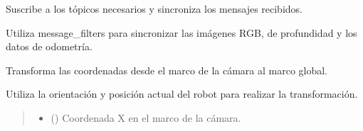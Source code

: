 \documentclass[a4paper,10pt,spanish]{sphinxmanual}
\begin{document}
\begin{fulllineitems}
\begin{fulllineitems}
\begin{quote}
\begin{description}
\end{description}\end{quote}

\end{fulllineitems}


\begin{fulllineitems}
\label{\detokenize{squad_object_detection_action:squad_object_detection_action.TurtleBotObjectDetectionAction.subscribe_to_topics}}
\pysigstartsignatures
{}
\pysigstopsignatures
\sphinxAtStartPar
Suscribe a los tópicos necesarios y sincroniza los mensajes recibidos.

\sphinxAtStartPar
Utiliza message\_filters para sincronizar las imágenes RGB, de profundidad y los datos de odometría.

\end{fulllineitems}


\begin{fulllineitems}
\label{\detokenize{squad_object_detection_action:squad_object_detection_action.TurtleBotObjectDetectionAction.transform_camera_to_global}}
\pysigstartsignatures
{}
\pysigstopsignatures
\sphinxAtStartPar
Transforma las coordenadas desde el marco de la cámara al marco global.

\sphinxAtStartPar
Utiliza la orientación y posición actual del robot para realizar la transformación.
\begin{quote}\begin{description}
\begin{itemize}
\item {} 
\sphinxAtStartPar
{} () \textendash{} Coordenada X en el marco de la cámara.


\end{itemize}
\end{description}
\end{quote}
\end{fulllineitems}
\end{fulllineitems}
\end{document}

